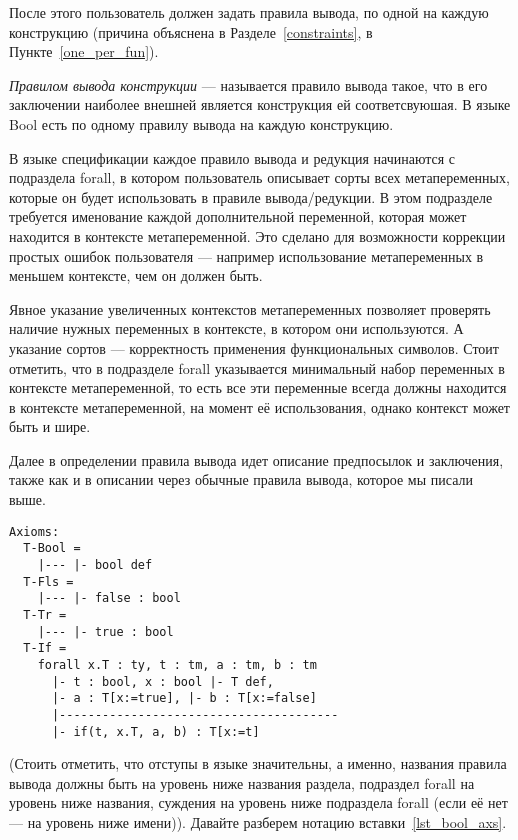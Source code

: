 После этого пользователь должен задать правила вывода, по одной на каждую конструкцию (причина объяснена в Разделе~\ref{constraints}, в Пункте~\ref{one_per_fun}).

\textit{Правилом вывода конструкции} --- называется правило вывода такое, что в его заключении наиболее внешней является конструкция ей соответсвуюшая. В языке Bool есть по одному правилу вывода на каждую конструкцию.

В языке спецификации каждое правило вывода и редукция начинаются с подраздела forall, в котором пользователь описывает сорты всех метапеременных, которые он будет использовать в правиле вывода/редукции. В этом подразделе требуется именование каждой дополнительной переменной, которая может находится в контексте метапеременной. Это сделано для возможности коррекции простых ошибок пользователя --- например использование метапеременных в меньшем контексте, чем он должен быть.

Явное указание увеличенных контекстов метапеременных позволяет проверять наличие нужных переменных в контексте, в котором они используются. А указание сортов --- корректность применения функциональных символов. Стоит отметить, что в подразделе forall указывается минимальный набор переменных в контексте метапеременной, то есть все эти переменные всегда должны находится в контексте метапеременной, на момент её использования, однако контекст может быть и шире.

Далее в определении правила вывода идет описание предпосылок и заключения, также как и в описании через обычные правила вывода, которое мы писали выше.

\begin{lstlisting}[label={lst_bool_axs}, caption={Правила вывода языка Bool, описанные в языке спецификации},captionpos=b, frame=single, float]
Axioms:
  T-Bool =
    |--- |- bool def
  T-Fls =
    |--- |- false : bool
  T-Tr =
    |--- |- true : bool
  T-If =
    forall x.T : ty, t : tm, a : tm, b : tm
      |- t : bool, x : bool |- T def,
      |- a : T[x:=true], |- b : T[x:=false]
      |---------------------------------------
      |- if(t, x.T, a, b) : T[x:=t]
\end{lstlisting}

(Стоить отметить, что отступы в языке значительны, а именно, названия правила вывода должны быть на уровень ниже названия раздела, подраздел forall на уровень ниже названия, суждения на уровень ниже подраздела forall (если её нет --- на уровень ниже имени)). Давайте разберем нотацию вставки~\ref{lst_bool_axs}.


